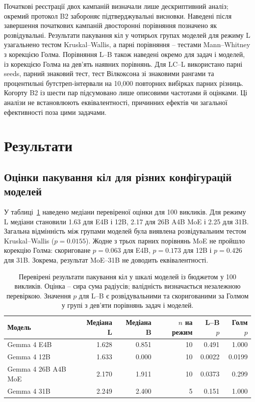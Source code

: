 \documentclass[11pt]{article}
\begin{document}
Початкові реєстрації двох кампаній визначали лише дескриптивний аналіз; окремий протокол B2 забороняє підтверджувальні висновки. Наведені після завершення початкових кампаній двосторонні порівняння позначено як розвідувальні. Результати пакування кіл у чотирьох групах моделей для режиму L узагальнено тестом Kruskal--Wallis, а парні порівняння -- тестами Mann--Whitney з корекцією Голма. Порівняння L--B також наведені окремо для задач і моделей, із корекцією Голма на дев'ять наявних порівнянь. Для LC--L використано парні seeds, парний знаковий тест, тест Вілкоксона зі знаковими рангами та процентильні бутстреп-інтервали на 10{,}000 повторних вибірках парних різниць. Когорту B2 із шести пар підсумовано лише описовими частотами й оцінками. Ці аналізи не встановлюють еквівалентності, причинних ефектів чи загальної ефективності поза цими задачами.

\section{Результати}\label{sec:results}

\subsection{Оцінки пакування кіл для різних конфігурацій моделей}

У таблиці~\ref{tab:scale} наведено медіани перевіреної оцінки для 100 викликів. Для режиму L медіани становили 1.63 для E4B і 12B, 2.17 для 26B A4B MoE і 2.25 для 31B. Загальна відмінність між групами моделей була виявлена розвідувальним тестом Kruskal--Wallis ($p=0.0155$). Жодне з трьох парних порівнянь MoE не пройшло корекцію Голма: скориговане $p=0.063$ для E4B, $p=0.173$ для 12B і $p=0.426$ для 31B. Зокрема, результат MoE--31B не доводить еквівалентності.

\begin{table}[tb]
\centering\small
\caption{Перевірені результати пакування кіл у шкалі моделей із бюджетом у 100 викликів. Оцінка -- сира сума радіусів; валідність визначається незалежною перевіркою. Значення $p$ для L--B є розвідувальними та скоригованими за Голмом у групі з дев'яти порівнянь задач і моделей.}
\label{tab:scale}
\begin{tabularx}{\linewidth}{@{}lrrrrr@{}}
\toprule
Модель & Медіана L & Медіана B & $n$ на режим & L--B $p$ & Голм $p$ \\
\midrule
Gemma 4 E4B & 1.628 & 0.851 & 10 & 0.491 & 1.000 \\
Gemma 4 12B & 1.633 & 0.000 & 10 & 0.0022 & 0.0199 \\
Gemma 4 26B A4B MoE & 2.170 & 1.911 & 10 & 0.0373 & 0.299 \\
Gemma 4 31B & 2.249 & 2.400 & 5 & 0.151 & 1.000 \\
\bottomrule
\end{tabularx}
\end{table}
\end{document}
